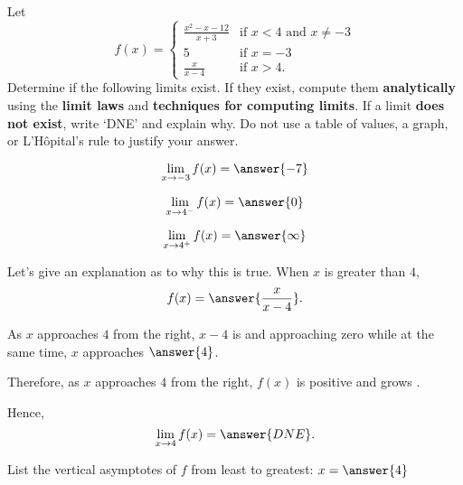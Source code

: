 \documentclass{ximera}
\begin{document}
Let 
\[
f(x)=\begin{cases}
\frac{x^2-x-12}{x+3} & \text{if $x<4$ and $x\ne -3$}\\
5 & \text{if $x=-3$}\\
\frac{x}{x-4} & \text{if $x>4$}.
\end{cases}
\]
Determine if the following limits exist. If they exist, compute them \textbf{analytically} using the \textbf{limit laws} and \textbf{techniques for computing limits}. If a limit \textbf{does not exist}, write `DNE' and explain why.  Do not use a table of values, a graph, or L'H\^opital's rule to justify your answer.
\begin{exercise}
  \[
  \lim_{x\to -3}f(x)=\answer{-7}
  \]
\end{exercise}
\begin{exercise}
  \[
  \lim_{x\to 4^{-}}f(x)=\answer{0}
  \]
\end{exercise}
\begin{exercise}
  \[
  \lim_{x\to 4^+}f(x)=\answer{\infty}
  \]
  \begin{exercise}
    Let's give an explanation as to why this is true. When $x$ is
    greater than $4$,
    \[
    f(x) = \answer{\frac{x}{x-4}}.
    \]
    \begin{exercise}As $x$ approaches $4$ from the right, $x-4$ is  and approaching zero while at the same time, $x$ approaches $\answer{4}$. \begin{exercise} Therefore, as $x$ approaches $4$ from the right, $f(x)$ is positive and grows . \begin{exercise} Hence, 
    \[
    \lim_{x\to 4}f(x)=\answer{DNE}.
    \]
    \end{exercise}
    \end{exercise}
    \end{exercise}
    \end{exercise}    
  \begin{exercise}
    List the vertical asymptotes of $f$ from least to greatest: $x=\answer{4}$
  \end{exercise}
\end{exercise}
\end{document}
